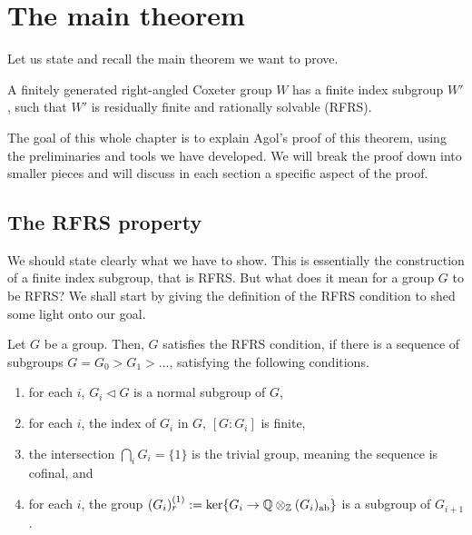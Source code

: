 \chapter{The main theorem}

Let us state and recall the main theorem we want to prove.

\begin{theorem*}
    A finitely generated right-angled Coxeter group \(W\) has a finite index subgroup \(W'\), such that \(W'\) is residually finite and rationally solvable (RFRS).
\end{theorem*}

The goal of this whole chapter is to explain Agol's proof of this theorem, using the preliminaries and tools we have developed.
We will break the proof down into smaller pieces and will discuss in each section a specific aspect of the proof.


\section{The RFRS property}

We should state clearly what we have to show.
This is essentially the construction of a finite index subgroup, that is RFRS.
But what does it mean for a group \(G\) to be RFRS?
We shall start by giving the definition of the RFRS condition to shed some light onto our goal.

\begin{definition}
    Let \(G\) be a group.
    Then, \(G\) satisfies the RFRS condition, if there is a sequence of subgroups \(G = G_0 > G_1 > \ldots\), satisfying the following conditions.
    \begin{enumerate}
        \item for each \(i\), \(G_i \triangleleft G\) is a normal subgroup of \(G\),
        \item for each \(i\), the index of \(G_i\) in \(G\), \([G : G_i]\) is finite,
        \item the intersection \(\bigcap_i G_i = \{1\}\) is the trivial group, meaning the sequence is cofinal, and
        \item for each \(i\), the group \((G_i)_r^{(1)} := \ker\{G_i \to \mathbb{Q} \otimes_{\mathbb{Z}} (G_i)_{\text{ab}}\}\) is a subgroup of \(G_{i+1}\).
    \end{enumerate}
\end{definition}

